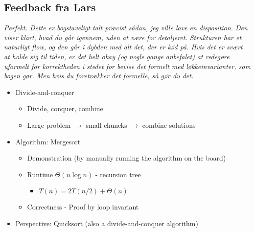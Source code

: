 \subsection*{Feedback fra Lars}
\textit{Perfekt. Dette er bogstaveligt talt præcist sådan, jeg ville lave en disposition. Den viser klart, hvad du går igennem, uden at være for detaljeret. Strukturen har et naturligt flow, og den går i dybden med alt det, der er kød på. Hvis det er svært at holde sig til tiden, er det helt okay (og nogle gange anbefalet) at redegøre uformelt for korrektheden i stedet for bevise det formelt med løkkeinvarianter, som bogen gør. Men hvis du foretrækker det formelle, så gør du det.
}


\begin{itemize}
    \item Divide-and-conquer
    \begin{itemize}
        \item Divide, conquer, combine
        \item Large problem $\to$ small chuncks $\to$ combine solutions
    \end{itemize}
    \item Algorithm: Mergesort
    \begin{itemize}
        \item Demonstration (by manually running the algorithm on the board)
        \item Runtime $\Theta(n\log n)$ - recursion tree
        \begin{itemize}
            \item $T(n)=2T(n/2)+ \Theta(n)$
        \end{itemize}
        \item Correctness - Proof by loop invariant
    \end{itemize}
    \item Perspective: Quicksort (also a divide-and-conquer algorithm)
\end{itemize}
